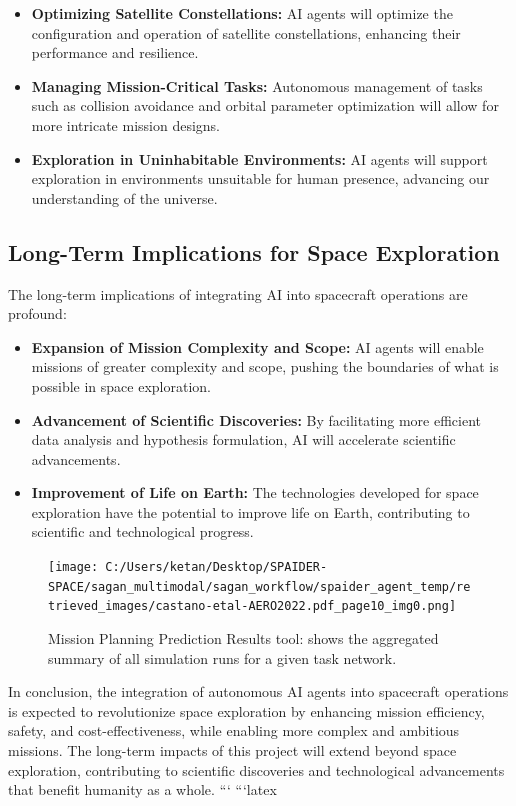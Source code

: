 \documentclass[a4paper, 11pt]{article}
\begin{document}
\begin{itemize}
    \item \textbf{Optimizing Satellite Constellations:} AI agents will optimize the configuration and operation of satellite constellations, enhancing their performance and resilience.
    \item \textbf{Managing Mission-Critical Tasks:} Autonomous management of tasks such as collision avoidance and orbital parameter optimization will allow for more intricate mission designs.
    \item \textbf{Exploration in Uninhabitable Environments:} AI agents will support exploration in environments unsuitable for human presence, advancing our understanding of the universe.
\end{itemize}

\subsection{Long-Term Implications for Space Exploration}

The long-term implications of integrating AI into spacecraft operations are profound:

\begin{itemize}
    \item \textbf{Expansion of Mission Complexity and Scope:} AI agents will enable missions of greater complexity and scope, pushing the boundaries of what is possible in space exploration.
    \item \textbf{Advancement of Scientific Discoveries:} By facilitating more efficient data analysis and hypothesis formulation, AI will accelerate scientific advancements.
    \item \textbf{Improvement of Life on Earth:} The technologies developed for space exploration have the potential to improve life on Earth, contributing to scientific and technological progress.
\end{itemize}

\begin{figure}[htbp]
    \centering
    \texttt{[image: C:/Users/ketan/Desktop/SPAIDER-SPACE/sagan\_multimodal/sagan\_workflow/spaider\_agent\_temp/retrieved\_images/castano-etal-AERO2022.pdf\_page10\_img0.png]}
    \caption{Mission Planning Prediction Results tool: shows the aggregated summary of all simulation runs for a given task network.}
    \label{fig:mission-planning}
\end{figure}

In conclusion, the integration of autonomous AI agents into spacecraft operations is expected to revolutionize space exploration by enhancing mission efficiency, safety, and cost-effectiveness, while enabling more complex and ambitious missions. The long-term impacts of this project will extend beyond space exploration, contributing to scientific discoveries and technological advancements that benefit humanity as a whole.
```
```latex
\end{document}
